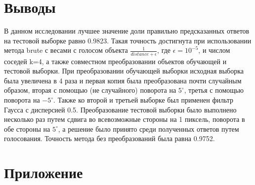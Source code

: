 \documentclass{article}
\begin{document}
\section{Выводы}

В данном исследовании лучшее значение доли правильно предсказанных ответов на тестовой выборке равно 0.9823. Такая точность достигнута при использовании метода brute с весами с голосом объекта $\frac{1}{distance + \epsilon}$, где $\epsilon={10}^{-5}$, и числом соседей k=4, а также совместном преобразовании объектов обучающей и тестовой выборки. При преобразовании обучающей выборки исходная выборка была увеличена в 4 раза и первая копия была преобразована почти случайным образом, вторая с помощью (не случайного) поворота на $5^\circ$, третья с помощью поворота на $-5^\circ$. Также
ко второй и третьей выборке был применен фильтр Гаусса с дисперсией 0.5. Преобразование тестовой выборки было выполнено несколько раз путем сдвига во всевозможные стороны на 1 пиксель, поворота в обе стороны на $5^\circ$, а решение было принято среди полученных ответов путем голосования. Точность метода без преобразований была равна 0.9752.

\newpage
\section*{Приложение}
\end{document}
